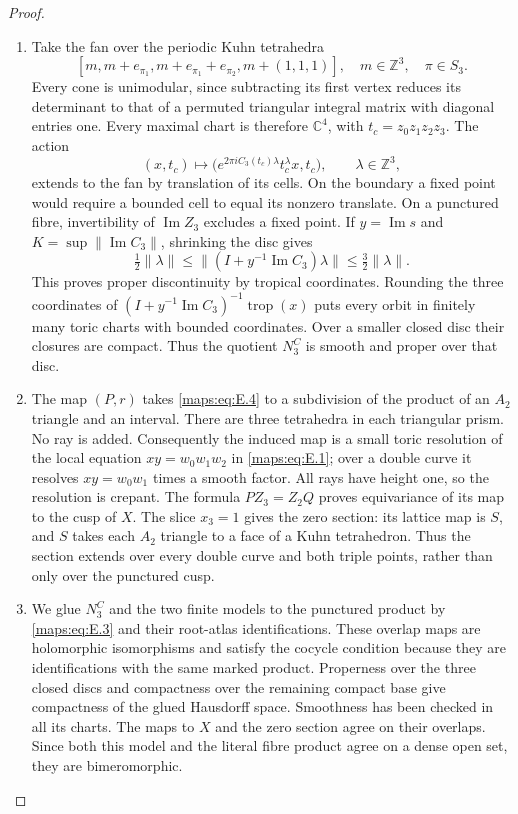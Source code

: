 \begin{proof}
\begin{enumerate}[label=\arabic*.,leftmargin=*]
\item Take the fan over the periodic Kuhn tetrahedra
\[
 [m,m+e_{\pi_1},m+e_{\pi_1}+e_{\pi_2},m+(1,1,1)],
 \quad m\in\mathbb Z^3,\quad\pi\in S_3.
 \tag{E.4}\label{maps:eq:E.4}
\]
Every cone is unimodular, since subtracting its first vertex reduces
its determinant to that of a permuted triangular integral matrix with
diagonal entries one.  Every maximal chart is therefore $\mathbb C^4$,
with $t_c=z_0z_1z_2z_3$.  The action
\[
 (x,t_c)\longmapsto
 \bigl(e^{2\pi iC_3(t_c)\lambda}t_c^\lambda x,t_c\bigr),
 \qquad\lambda\in\mathbb Z^3,
 \tag{E.5}\label{maps:eq:E.5}
\]
extends to the fan by translation of its cells.  On the boundary a
fixed point would require a bounded cell to equal its nonzero translate.
On a punctured fibre, invertibility of $\operatorname{Im}Z_3$ excludes
a fixed point.  If $y=\operatorname{Im}s$ and
$K=\sup\|\operatorname{Im}C_3\|$, shrinking the disc gives
\[
 \tfrac12\|\lambda\|\leq
 \|(I+y^{-1}\operatorname{Im}C_3)\lambda\|
 \leq\tfrac32\|\lambda\|.
\]
This proves proper discontinuity by tropical coordinates.  Rounding
the three coordinates of
$(I+y^{-1}\operatorname{Im}C_3)^{-1}\operatorname{trop}(x)$ puts every
orbit in finitely many toric charts with bounded coordinates.  Over a
smaller closed disc their closures are compact.  Thus the quotient
$N_3^C$ is smooth and proper over that disc.

\item The map $(P,r)$ takes \eqref{maps:eq:E.4} to a subdivision of the product of an
$A_2$ triangle and an interval.  There are three tetrahedra in each
triangular prism.  No ray is added.  Consequently the induced map is
a small toric resolution of the local equation
$xy=w_0w_1w_2$ in \eqref{maps:eq:E.1}; over a double curve it resolves
$xy=w_0w_1$ times a smooth factor.  All rays have height one, so the
resolution is crepant.  The formula $PZ_3=Z_2Q$ proves equivariance
of its map to the cusp of $X$.  The slice $x_3=1$ gives the zero
section: its lattice map is $S$, and $S$ takes each $A_2$ triangle
to a face of a Kuhn tetrahedron.  Thus the section extends over every
double curve and both triple points, rather than only over the
punctured cusp.

\item We glue $N_3^C$ and the two finite models to the punctured product by
\eqref{maps:eq:E.3} and their root-atlas identifications.  These overlap maps are
holomorphic isomorphisms and satisfy the cocycle condition because
they are identifications with the same marked product.  Properness
over the three closed discs and compactness over the remaining compact
base give compactness of the glued Hausdorff space.  Smoothness has
been checked in all its charts.  The maps to $X$ and the zero section
agree on their overlaps.  Since both this model and the literal
fibre product agree on a dense open set, they are bimeromorphic.
\end{enumerate}
\end{proof}

